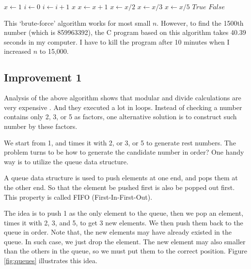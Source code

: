 \documentclass{article}
\begin{document}
\begin{algorithmic}[1]
  \State $x \gets 1$
  \State $i \gets 0$
  \Loop
      \State $i \gets i + 1$
        \State \Return $x$
      \EndIf
    \EndIf
    \State $x \gets x + 1$
  \EndLoop
\EndFunction
\Statex
{}
    \State $x \gets x / 2$
  \EndWhile
    \State $x \gets x / 3$
  \EndWhile
    \State $x \gets x / 5$
  \EndWhile
    \State \Return $True$
  \Else
    \State \Return $False$
  \EndIf
\EndFunction
\end{algorithmic}

This `brute-force' algorithm works for most small $n$. However, to find
the 1500th number (which is 859963392), the C program based on this
algorithm takes 40.39 seconds in my computer. I have to kill the program
after 10 minutes when I increased $n$ to 15,000.

\subsection{Improvement 1}
Analysis of the above algorithm shows that modular and divide calculations
are very expensive \cite{Bentley}. And they executed a lot in loops.
Instead of checking a number contains only 2, 3, or 5 as factors, one
alternative solution is to construct such number by these factors.

We start from 1, and times it with 2, or 3, or 5 to generate rest numbers.
The problem turns to be how to generate the candidate number in order?
One handy way is to utilize the queue data structure.

A queue data structure is used to push elements at one end, and pops
them at the other end. So that the element be pushed first is also
be popped out first. This property is called FIFO (First-In-First-Out).

The idea is to push 1 as the only element to the queue, then we pop
an element, times it with 2, 3, and 5, to get 3 new elements. We
then push them back to the queue in order. Note that, the new elements may
have already existed in the queue. In such case, we just drop the
element. The new element may also smaller than the others in the queue,
so we must put them to the correct position. Figure \ref{fig:queues}
illustrates this idea.
\end{document}
